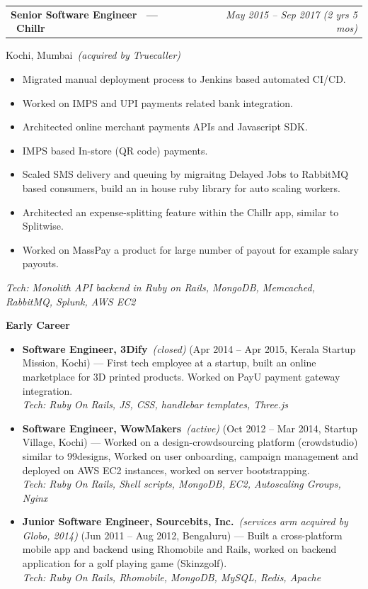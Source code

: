 \documentclass[10.5pt,a4paper]{article}
\makeatletter
\newcommand{\jobheader}[3]{%
  \noindent
  \begin{tabular*}{\textwidth}{@{\extracolsep{\fill}}l r}
    \textbf{\large #1} & {\itshape\color{lightgray} #3} \\
  \end{tabular*}\par
}
\newcommand{\jobentry}[4]{%
  \jobheader{#1 \ --- \ \textbf{#2}}{}{#3}
  {\color{graytext} #4}\par\vspace{2pt}
}
\newcommand{\techline}[1]{%
  {\small\itshape\color{blue} Tech: #1}\par\vspace{6pt}
}
\newcommand{\status}[1]{\ {\normalfont\small\itshape\color{lightgray}(#1)}}
\makeatother
\begin{document}
\jobentry{Senior Software Engineer}{Chillr}{May 2015 -- Sep 2017 (2 yrs 5 mos)}{Kochi, Mumbai\status{acquired by Truecaller}}
\begin{itemize}[leftmargin=16pt, itemsep=1pt, topsep=2pt, parsep=0pt]
  \item Migrated manual deployment process to Jenkins based automated CI/CD.
  \item Worked on IMPS and UPI payments related bank integration.
  \item Architected online merchant payments APIs and Javascript SDK.
  \item IMPS based In-store (QR code) payments.
  \item Scaled SMS delivery and queuing by migraitng Delayed Jobs to RabbitMQ based consumers, build an in house ruby library for auto scaling workers.
  \item Architected an expense-splitting feature within the Chillr app, similar to Splitwise.
  \item Worked on MassPay a product for large number of payout for example salary payouts.
\end{itemize}
\techline{Monolith API backend in Ruby on Rails, MongoDB, Memcached, RabbitMQ, Splunk, AWS EC2}

{\bfseries\color{navy} Early Career}\par\vspace{2pt}
\begin{itemize}[leftmargin=16pt, itemsep=1pt, topsep=2pt, parsep=0pt]
  \item \textbf{Software Engineer, 3Dify}\status{closed} (Apr 2014 -- Apr 2015, Kerala Startup Mission, Kochi) --- First tech employee at a startup, built an online marketplace for 3D printed products. Worked on PayU payment gateway integration. \\
  \techline{Ruby On Rails, JS, CSS, handlebar templates, Three.js }
  \item \textbf{Software Engineer, WowMakers}\status{active} (Oct 2012 -- Mar 2014, Startup Village, Kochi) --- Worked on a design-crowdsourcing platform (crowdstudio) similar to 99designs, Worked on user onboarding, campaign management and deployed on AWS EC2 instances, worked on server bootstrapping. \\
  \techline{Ruby On Rails, Shell scripts, MongoDB, EC2, Autoscaling Groups, Nginx}
  \item \textbf{Junior Software Engineer, Sourcebits, Inc.}\status{services arm acquired by Globo, 2014} (Jun 2011 -- Aug 2012, Bengaluru) --- Built a cross-platform mobile app and backend using Rhomobile and Rails, worked on backend application for a golf playing game (Skinzgolf). \\
  \techline{Ruby On Rails, Rhomobile, MongoDB, MySQL, Redis, Apache}
\end{itemize}
\end{document}
